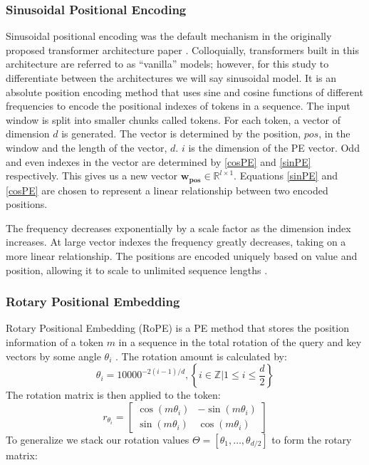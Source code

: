 \subsubsection{Sinusoidal Positional Encoding}
\label{sec:sinusoidalPE}
Sinusoidal positional encoding was the default mechanism in the originally proposed transformer architecture paper \cite{vaswani2017attention}. Colloquially,
transformers built in this architecture are referred to as ``vanilla'' models; however, for this study to differentiate between the architectures we will say sinusoidal model. 
It is an absolute position encoding method that uses sine and cosine functions of different frequencies to encode the positional indexes of tokens in a sequence.
The input window is split into smaller chunks called tokens. For each token, a vector of dimension $d$ is generated. The vector is determined by the position, $pos$, in the window and the length of the vector, $d$.
$i$ is the dimension of the PE vector. Odd and even indexes in the vector are determined by \eqref{cosPE} and \eqref{sinPE} respectively. This gives us a new vector $\mathbf{w_\text{pos}} \in \mathbb{R}^{l \times 1}$.
Equations \eqref{sinPE} and \eqref{cosPE} are chosen to represent a linear relationship between two encoded positions.





 The frequency decreases exponentially by a scale factor as the dimension index increases.
 At large vector indexes the frequency greatly decreases, taking on a more linear relationship.
 The positions are encoded uniquely based on value and position, allowing it to scale to unlimited sequence lengths \cite{vaswani2017attention}.
\subsubsection{Rotary Positional Embedding}

Rotary Positional Embedding (RoPE) is a PE method that stores the position information of a token $m$ in a sequence
in the total rotation of the query and key vectors by some angle $\theta_i$ \cite{su2021roformer}. The rotation amount is calculated by:
$$
\theta_i = 10000^{-2(i-1)/d}, \left\{i \in \mathbb{Z} \Bigg| 1 \leq i \leq \frac{d}{2}\right\}
$$
The rotation matrix is then applied to the token:
$$
r_{\theta_i} =  
\begin{bmatrix} 
\cos (m\theta_i) & -\sin (m\theta_i)  \\
\sin (m\theta_i) & \cos (m\theta_i )
\end{bmatrix}
$$
To generalize we stack our rotation values $\Theta = [\theta_1, \dots, \theta_{d/2}]$ to form the rotary matrix:

